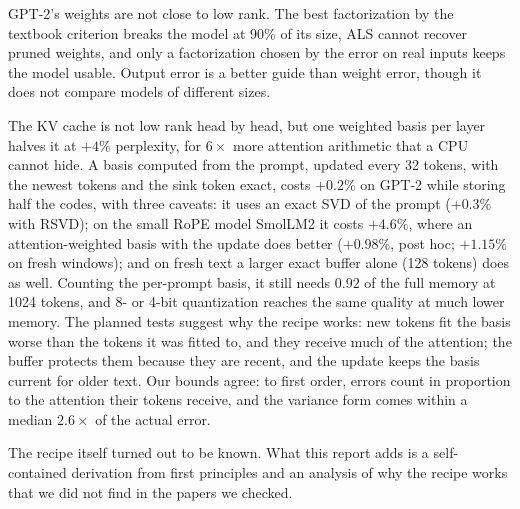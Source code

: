 \documentclass[10pt]{article}
\theoremstyle{plain}
\theoremstyle{definition}
\theoremstyle{remark}
\begin{document}
GPT-2's weights are not close to low rank. The best factorization by the textbook criterion breaks the model at 90\% of its size, ALS cannot recover pruned weights, and only a factorization chosen by the error on real inputs keeps the model usable. Output error is a better guide than weight error, though it does not compare models of different sizes.

The KV cache is not low rank head by head, but one weighted basis per layer halves it at $+4\%$ perplexity, for $6\times$ more attention arithmetic that a CPU cannot hide. A basis computed from the prompt, updated every 32 tokens, with the newest tokens and the sink token exact, costs $+0.2\%$ on GPT-2 while storing half the codes, with three caveats: it uses an exact SVD of the prompt ($+0.3\%$ with RSVD); on the small RoPE model SmolLM2 it costs $+4.6\%$, where an attention-weighted basis with the update does better ($+0.98\%$, post hoc; $+1.15\%$ on fresh windows); and on fresh text a larger exact buffer alone (128 tokens) does as well. Counting the per-prompt basis, it still needs $0.92$ of the full memory at 1024 tokens, and 8- or 4-bit quantization reaches the same quality at much lower memory. The planned tests suggest why the recipe works: new tokens fit the basis worse than the tokens it was fitted to, and they receive much of the attention; the buffer protects them because they are recent, and the update keeps the basis current for older text. Our bounds agree: to first order, errors count in proportion to the attention their tokens receive, and the variance form comes within a median $2.6\times$ of the actual error.

The recipe itself turned out to be known. What this report adds is a self-contained derivation from first principles and an analysis of why the recipe works that we did not find in the papers we checked.

\FloatBarrier
\end{document}

